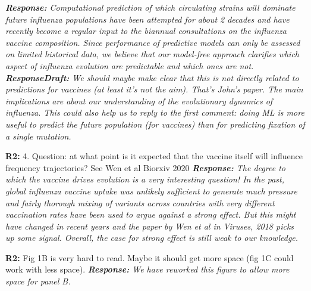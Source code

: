 \documentclass[aps,rmp,onecolumn]{revtex4-1}
\newcommand{\refb}[1]{\textbf{R2:} #1\vskip 5mm}
\newcommand{\response}[1]{{\it {\color{response}\textbf{Response:} #1}}\vskip 5mm}
\newcommand{\responsedraft}[1]{{\it {\color{purple}\textbf{ResponseDraft:} #1}}\vskip 5mm}
\begin{document}
\response{
	Computational prediction of which circulating strains will dominate future influenza populations have been attempted for about 2 decades and have recently become a regular input to the biannual consultations on the influenza vaccine composition.
	Since performance of predictive models can only be assessed on limited historical data, we believe that our model-free approach clarifies which aspect of influenza evolution are predictable and which ones are not.
}
\responsedraft{We should maybe make clear that this is not directly related to predictions for vaccines (at least it's not the aim). 
That's John's paper. 
The main implications are about our understanding of the evolutionary dynamics of influenza. 
This could also help us to reply to the first comment: doing ML is more useful to predict the future population (for vaccines) than for predicting fixation of a single mutation. }

\refb{4. Question: at what point is it expected that the vaccine itself will influence frequency trajectories? See Wen et al Biorxiv 2020}
\response{
	The degree to which the vaccine drives evolution is a very interesting question!
	In the past, global influenza vaccine uptake was unlikely sufficient to generate much pressure and fairly thorough mixing of variants across countries with very different vaccination rates have been used to argue against a strong effect. But this might have changed in recent years and the paper by Wen et al in Viruses, 2018 picks up some signal.
	Overall, the case for strong effect is still weak to our knowledge.
}

\refb{Fig 1B is very hard to read. Maybe it should get more space (fig 1C could work with less space).}
\response{We have reworked this figure to allow more space for panel B.}
\end{document}
